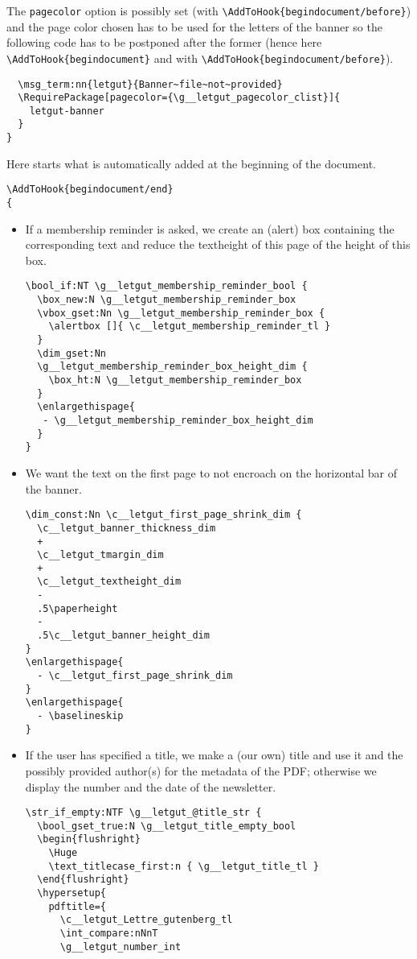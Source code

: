 \documentclass{letgut}
\begin{document}
The \lstinline+pagecolor+ option is possibly set (with \lstinline+\AddToHook{begindocument/before}+)
and the page color chosen has to be used for the letters of the banner so the
following code has to be postponed after the former (hence here
\lstinline+\AddToHook{begindocument}+ and with \lstinline+\AddToHook{begindocument/before}+).

\begin{lstlisting}
  \msg_term:nn{letgut}{Banner~file~not~provided}
  \RequirePackage[pagecolor={\g__letgut_pagecolor_clist}]{
    letgut-banner
  }
}
\end{lstlisting}

Here starts what is automatically added at the beginning of the document.

\begin{lstlisting}
\AddToHook{begindocument/end}
{
\end{lstlisting}

\begin{itemize}
\item If a membership reminder is asked, we create an (alert) box containing the
corresponding text and reduce the textheight of this page of the height of
this box.
\begin{lstlisting}
\bool_if:NT \g__letgut_membership_reminder_bool {
  \box_new:N \g__letgut_membership_reminder_box
  \vbox_gset:Nn \g__letgut_membership_reminder_box {
    \alertbox []{ \c__letgut_membership_reminder_tl }
  }
  \dim_gset:Nn
  \g__letgut_membership_reminder_box_height_dim {
    \box_ht:N \g__letgut_membership_reminder_box
  }
  \enlargethispage{
   - \g__letgut_membership_reminder_box_height_dim
  }
}
\end{lstlisting}
\item We want the text on the first page to not encroach on the horizontal bar of
the banner.
\begin{lstlisting}
\dim_const:Nn \c__letgut_first_page_shrink_dim {
  \c__letgut_banner_thickness_dim
  +
  \c__letgut_tmargin_dim
  +
  \c__letgut_textheight_dim
  -
  .5\paperheight
  -
  .5\c__letgut_banner_height_dim
}
\enlargethispage{
  - \c__letgut_first_page_shrink_dim
}
\enlargethispage{
  - \baselineskip
}
\end{lstlisting}
\item If the user has specified a title, we make a (our own) title and use it and
the possibly provided author(s) for the metadata of the PDF; otherwise we
display the number and the date of the newsletter.
\begin{lstlisting}
\str_if_empty:NTF \g__letgut_@title_str {
  \bool_gset_true:N \g__letgut_title_empty_bool
  \begin{flushright}
    \Huge
    \text_titlecase_first:n { \g__letgut_title_tl }
  \end{flushright}
  \hypersetup{
    pdftitle={
      \c__letgut_Lettre_gutenberg_tl
      \int_compare:nNnT
      \g__letgut_number_int
\end{lstlisting}
\end{itemize}
\end{document}
